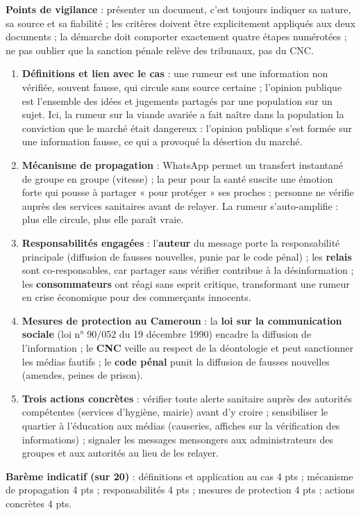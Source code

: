 \documentclass[11pt]{article}
\newcommand{\cle}[1]{{\popxbold\color{popdark}#1}}
\begin{document}
\begin{corrige}
\textbf{Points de vigilance} : présenter un document, c'est toujours indiquer sa nature, sa source et sa fiabilité ; les critères doivent être explicitement appliqués aux deux documents ; la démarche doit comporter exactement quatre étapes numérotées ; ne pas oublier que la sanction pénale relève des tribunaux, pas du CNC.
\end{corrige}

\begin{corrige}
\begin{enumerate}
\item \textbf{Définitions et lien avec le cas} : une \cle{rumeur} est une information non vérifiée, souvent fausse, qui circule sans source certaine ; l'\cle{opinion publique} est l'ensemble des idées et jugements partagés par une population sur un sujet. Ici, la rumeur sur la viande avariée a fait naître dans la population la conviction que le marché était dangereux : l'opinion publique s'est formée sur une information fausse, ce qui a provoqué la désertion du marché.
\item \textbf{Mécanisme de propagation} : WhatsApp permet un transfert instantané de groupe en groupe (vitesse) ; la peur pour la santé suscite une émotion forte qui pousse à partager « pour protéger » ses proches ; personne ne vérifie auprès des services sanitaires avant de relayer. La rumeur s'auto-amplifie : plus elle circule, plus elle paraît vraie.
\item \textbf{Responsabilités engagées} : l'\textbf{auteur} du message porte la responsabilité principale (diffusion de fausses nouvelles, punie par le code pénal) ; les \textbf{relais} sont co-responsables, car partager sans vérifier contribue à la désinformation ; les \textbf{consommateurs} ont réagi sans esprit critique, transformant une rumeur en crise économique pour des commerçants innocents.
\item \textbf{Mesures de protection au Cameroun} : la \textbf{loi sur la communication sociale} (loi n° 90/052 du 19 décembre 1990) encadre la diffusion de l'information ; le \textbf{CNC} veille au respect de la déontologie et peut sanctionner les médias fautifs ; le \textbf{code pénal} punit la diffusion de fausses nouvelles (amendes, peines de prison).
\item \textbf{Trois actions concrètes} : vérifier toute alerte sanitaire auprès des autorités compétentes (services d'hygiène, mairie) avant d'y croire ; sensibiliser le quartier à l'éducation aux médias (causeries, affiches sur la vérification des informations) ; signaler les messages mensongers aux administrateurs des groupes et aux autorités au lieu de les relayer.
\end{enumerate}
\textbf{Barème indicatif (sur 20)} : définitions et application au cas 4 pts ; mécanisme de propagation 4 pts ; responsabilités 4 pts ; mesures de protection 4 pts ; actions concrètes 4 pts.


\end{corrige}
\end{document}
